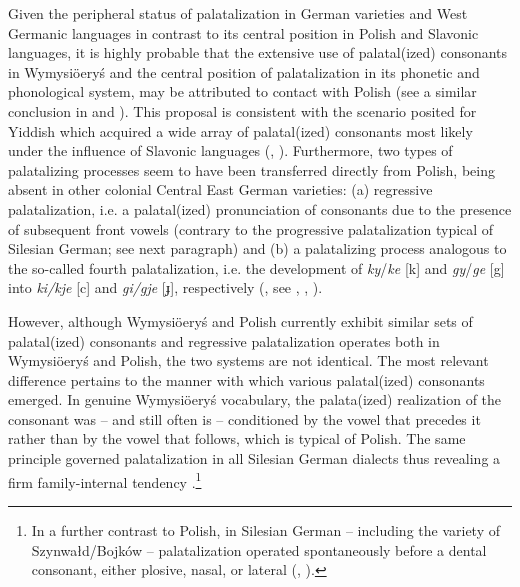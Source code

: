 \documentclass[output=paper,hidelinks]{langscibook}
\begin{document}
Given the peripheral status of palatalization in German varieties and West Germanic languages in contrast to its central position in Polish and Slavonic languages, it is highly probable that the extensive use of palatal(ized) consonants in Wymysiöeryś and the central position of palatalization in its phonetic and phonological system, may be attributed to contact with Polish (see a similar conclusion in \citealt[15]{kleczkowski_dialekt_1920} and \citealt[136]{zak_influence_2016}). This proposal is consistent with the scenario posited for Yiddish which acquired a wide array of palatal(ized) consonants most likely under the influence of Slavonic languages (\citealt[394]{jacobs_yiddish_1994}, \citealt[26]{harbert_germanic_2007}). Furthermore, two types of palatalizing processes seem to have been transferred directly from Polish, being absent in other colonial Central East German varieties: (a) regressive palatalization, i.e. a palatal(ized) pronunciation of consonants due to the presence of subsequent front vowels (contrary to the progressive palatalization typical of Silesian German; see next paragraph) and (b) a palatalizing process analogous to the so-called fourth palatalization, i.e. the development of \textit{ky}/\textit{ke} [k] and \textit{gy}/\textit{ge} [g] into \textit{ki/kje} [c] and \textit{gi/gje} [ɟ], respectively (\citealt[136]{zak_influence_2016}, see \citealt[124--129]{dejna_dialekty_1973}, \citealt[244]{urbanczyk_encyklopedia_1991}, \citealt[146--147]{dlugosz-kurczabowa_gramatyka_2006}).

However, although Wymysiöeryś and Polish currently exhibit similar sets of palatal(ized) consonants and regressive palatalization operates both in Wymysiöeryś and Polish, the two systems are not identical. The most relevant difference pertains to the manner with which various palatal(ized) consonants emerged. In genuine Wymysiöeryś vocabulary, the palata(ized) realization of the consonant was – and still often is – conditioned by the vowel that precedes it \citep[125]{kleczkowski_dialekt_1920} rather than by the vowel that follows, which is typical of Polish. The same principle governed palatalization in all Silesian German dialects thus revealing a firm family-internal tendency \citep[71]{von_unwerth_schlesische_1908}.\footnote{In a further contrast to Polish, in Silesian German – including the variety of Szynwałd/Bojków – palatalization operated spontaneously before a dental consonant, either plosive, nasal, or lateral (\citealt[38--39, 68--69]{von_unwerth_schlesische_1908}, \citealt[98]{gusinde_vergessene_1911}).}
\end{document}
